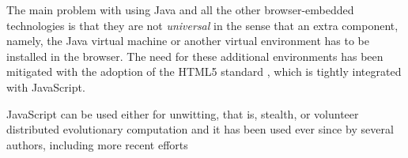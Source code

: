 \documentclass{sig-alternate}
\begin{document}
The main problem with using Java and all the other browser-embedded
technologies is that they are not {\em universal} in the
sense that an extra component, namely, the Java virtual machine or another
virtual environment has to be installed in the browser.
The need for
these additional environments has been mitigated with the
adoption of the HTML5 standard \cite{anthes2012html5}, which is
tightly integrated with JavaScript.

JavaScript can be used either for unwitting, that is, stealth,
\cite{unwitting-ec} or volunteer 
\cite{langdon:2005:metas,gecco07:workshop:dcor} distributed
evolutionary computation and it has been used ever since by several
authors, including more recent efforts
\cite{duda2013distributed,DBLP:journals/corr/abs-0801-1210} 


\end{document}
